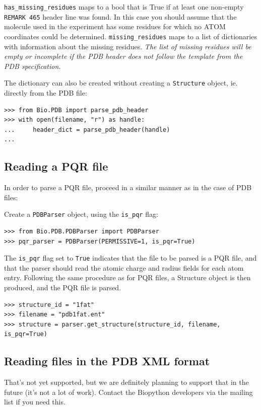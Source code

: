 \verb+has_missing_residues+ maps to a bool that is True if at least
one non-empty \verb+REMARK 465+ header line was found. In this case
you should assume that the molecule used in the experiment has some
residues for which no ATOM coordinates could be determined.
\verb+missing_residues+ maps to a list of dictionaries with information
about the missing residues. \emph{The list of missing residues will be
empty or incomplete if the PDB header does not follow the template from
the PDB specification.}

The dictionary can also be created without creating a \texttt{Structure}
object, ie. directly from the PDB file:

\begin{verbatim}
>>> from Bio.PDB import parse_pdb_header
>>> with open(filename, "r") as handle:
...     header_dict = parse_pdb_header(handle)
...
\end{verbatim}

\subsection{Reading a PQR file}

In order to parse a PQR file, proceed in a similar manner as in the case
of PDB files:

Create a \texttt{PDBParser} object, using the \texttt{is\_pqr} flag:

\begin{verbatim}
>>> from Bio.PDB.PDBParser import PDBParser
>>> pqr_parser = PDBParser(PERMISSIVE=1, is_pqr=True)
\end{verbatim}

The \texttt{is\_pqr} flag set to \texttt{True} indicates that the file to be parsed is a PQR file,
and that the parser should read the atomic charge and radius fields for each atom entry. Following the same procedure as for PQR files, a Structure object is then produced, and the PQR file is parsed.

\begin{verbatim}
>>> structure_id = "1fat"
>>> filename = "pdb1fat.ent"
>>> structure = parser.get_structure(structure_id, filename, is_pqr=True)
\end{verbatim}

\subsection{Reading files in the PDB XML format}

That's not yet supported, but we are definitely planning to support that
in the future (it's not a lot of work). Contact the Biopython developers
via the mailing list if you need this.

